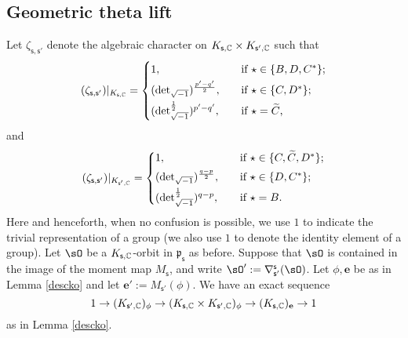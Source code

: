 \documentclass[12pt,a4paper]{amsart}
\newcommand{\p}{\mathfrak p}
\numberwithin{equation}{section}
\theoremstyle{remark}
\begin{document}
\subsection{Geometric theta lift} \label{sec:dlift}
Let $\zeta_{\mathsf s, \mathsf s'}$ denote the algebraic character on $K_{\mathsf s, \mathbb{C}}\times K_{\mathsf s', \mathbb{C}}$  such that
\[
 (\zeta_{\mathsf s, \mathsf s'})|_{K_{\mathsf s, \C}}=
   \begin{cases}
    1, \quad & \textrm{if $\star\in \{B, D, C^*\}$}; \smallskip\\
      ({\det}_{\sqrt{-1}})^{\frac{p'-q'}{2}}, \quad & \textrm{if $\star\in \{C, D^*\}$};\smallskip\\
     ({\det}_{\sqrt{-1}}^{\frac{1}{2}})^{p'-q'}, \quad & \textrm{if $\star=\widetilde C$,}\\
  \end{cases}
\]
and
\[
 (\zeta_{\mathsf s, \mathsf s'})|_{K_{\mathsf s', \C}}=
   \begin{cases}
    1, \quad & \textrm{if $\star\in \{C, \widetilde C, D^*\}$}; \smallskip\\
      ({\det}_{\sqrt{-1}})^{\frac{q-p}{2}}, \quad & \textrm{if $\star\in \{D, C^*\}$};\smallskip\\
     ({\det}_{\sqrt{-1}}^{\frac{1}{2}})^{q-p}, \quad & \textrm{if $\star=B$}.
 \end{cases}
\]
Here and henceforth, when no confusion is possible, we  use $1$ to indicate the trivial representation of a group (we also use $1$ to denote the identity element of a group).
Let  $\sO$ be a $K_{\mathsf s, \mathbb{C}}$-orbit in $\p_{\mathsf s}$ as before. Suppose that $\sO$ is contained in the image of the moment map $M_{\mathsf s}$, and write $\sO':=\nabla^{\mathsf s}_{\mathsf s'}(\sO)$.
Let $\phi,\mathbf e$ be as in Lemma  \ref{descko} and let $\mathbf e':=M_{\mathsf s'}(\phi)$. We have an exact sequence
\[
  1\rightarrow  (K_{\mathsf s',\mathbb{C}})_\phi\rightarrow (K_{\mathsf s,\mathbb{C}}\times K_{\mathsf s', \mathbb{C}})_\phi\rightarrow (K_{\mathsf s,\mathbb{C}})_{\mathbf e}\rightarrow 1
\]
as in Lemma  \ref{descko}.
\end{document}
